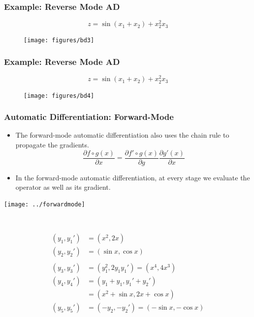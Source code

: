 \documentclass{beamer}
\begin{document}
\begin{frame}
\frametitle{Example: Reverse Mode AD}	
$$z=\sin(x_1+x_2) + x_2^2x_3$$
\begin{figure}[hbt]
\centering
  \texttt{[image: figures/bd3]}
\end{figure}
\end{frame}

\begin{frame}
\frametitle{Example: Reverse Mode AD}	
$$z=\sin(x_1+x_2) + x_2^2x_3$$
\begin{figure}[hbt]
\centering
  \texttt{[image: figures/bd4]}
\end{figure}
\end{frame}


\begin{frame}
	\frametitle{Automatic Differentiation: Forward-Mode}

	\begin{itemize}
	\item The forward-mode automatic differentiation also uses the chain rule to propagate the gradients. 
	$$\frac{\partial f\circ g (x)}{\partial x} = \frac{\partial f'\circ g(x)}{\partial g} \frac{\partial g'(x)}{\partial x}$$
		\item In the forward-mode automatic differentiation, at every stage we evaluate the operator as well as its gradient.  
	\end{itemize}
	\begin{minipage}[b]{0.45\textwidth}
	\texttt{[image: ../forwardmode]}
\end{minipage}~
\begin{minipage}[b]{0.45\textwidth}
  \begin{align*}
(y_1, y_1')& = (x^2, 2x) \\
(y_2, y_2') &= (\sin x, \cos x)\\
\\
 (y_3, y_3') &= (y_1^2, 2y_1y_1') = (x^4, 4x^3)\\
 (y_4, y_4') &= (y_1+y_1, y_1'+y_2') \\
 &= (x^2+\sin x, 2x+\cos x) \\
 (y_5, y_5')& = (-y_2, -y_2') = (-\sin x, -\cos x)
 	\end{align*}
\end{minipage}
	
	
\end{frame}
\end{document}
